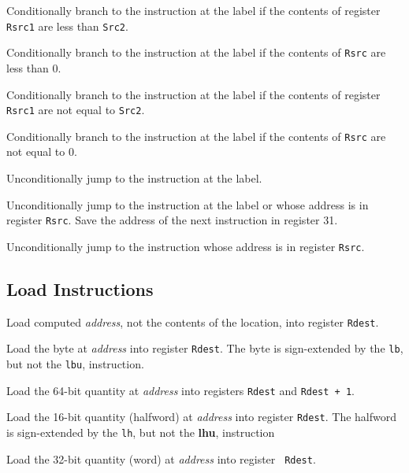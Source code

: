 \documentclass[11pt]{article}
\begin{document}
Conditionally branch to the instruction at the label if the contents
of register {\tt Rsrc1} are less than {\tt Src2}.

Conditionally branch to the instruction at the label if the contents
of {\tt Rsrc} are less than 0.

Conditionally branch to the instruction at the label if the contents
of register {\tt Rsrc1} are not equal to {\tt Src2}.

Conditionally branch to the instruction at the label if the contents
of {\tt Rsrc} are not equal to 0.

Unconditionally jump to the instruction at the label.

Unconditionally jump to the instruction at the label or whose address
is in register {\tt Rsrc}.  Save the address of the next
instruction in register 31.

Unconditionally jump to the instruction whose address is in register
{\tt Rsrc}.


\subsection {Load Instructions}

Load computed {\em address\/}, not the contents of the location, into
register {\tt Rdest}.

Load the byte at {\em address\/} into register {\tt Rdest}.  The byte
is sign-extended by the {\tt lb}, but not the {\tt lbu}, instruction.

Load the 64-bit quantity at {\em address\/} into registers {\tt Rdest}
and {\tt Rdest + 1}.

Load the 16-bit quantity (halfword) at {\em address\/} into register
{\tt Rdest}.  The halfword is sign-extended by the {\tt lh}, but not
the {\bf lhu}, instruction

Load the 32-bit quantity (word) at {\em address\/} into register {\tt
Rdest}.
\end{document}
